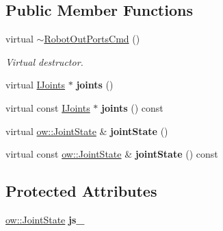 \subsection*{Public Member Functions}
\begin{DoxyCompactItemize}
\item 
virtual \hyperlink{classow__core_1_1RobotOutPortsCmd_ad018ac0a0a8c73aaf7bc62f7b28a0268}{$\sim$\+Robot\+Out\+Ports\+Cmd} ()\hypertarget{classow__core_1_1RobotOutPortsCmd_ad018ac0a0a8c73aaf7bc62f7b28a0268}{}\label{classow__core_1_1RobotOutPortsCmd_ad018ac0a0a8c73aaf7bc62f7b28a0268}

\begin{DoxyCompactList}\small\item\em Virtual destructor. \end{DoxyCompactList}\item 
virtual \hyperlink{classow__core_1_1IJoints}{I\+Joints} $\ast$ {\bfseries joints} ()\hypertarget{classow__core_1_1RobotOutPortsCmd_afb61fc492e221bfa994cf13c2ed92df6}{}\label{classow__core_1_1RobotOutPortsCmd_afb61fc492e221bfa994cf13c2ed92df6}

\item 
virtual const \hyperlink{classow__core_1_1IJoints}{I\+Joints} $\ast$ {\bfseries joints} () const \hypertarget{classow__core_1_1RobotOutPortsCmd_ad28a8aa922b9edf3815e016bbade0678}{}\label{classow__core_1_1RobotOutPortsCmd_ad28a8aa922b9edf3815e016bbade0678}

\item 
virtual \hyperlink{classow__core_1_1JointState}{ow\+::\+Joint\+State} \& {\bfseries joint\+State} ()\hypertarget{classow__core_1_1RobotOutPortsCmd_a4ea1c3b05b424d5c286d41ef73abca6f}{}\label{classow__core_1_1RobotOutPortsCmd_a4ea1c3b05b424d5c286d41ef73abca6f}

\item 
virtual const \hyperlink{classow__core_1_1JointState}{ow\+::\+Joint\+State} \& {\bfseries joint\+State} () const \hypertarget{classow__core_1_1RobotOutPortsCmd_a29242a677dca4a3c0a1f0ea74d088fc6}{}\label{classow__core_1_1RobotOutPortsCmd_a29242a677dca4a3c0a1f0ea74d088fc6}

\end{DoxyCompactItemize}
\subsection*{Protected Attributes}
\begin{DoxyCompactItemize}
\item 
\hyperlink{classow__core_1_1JointState}{ow\+::\+Joint\+State} {\bfseries js\+\_\+}\hypertarget{classow__core_1_1RobotOutPortsCmd_aece9d52a653226289b960d1a421fadc7}{}\label{classow__core_1_1RobotOutPortsCmd_aece9d52a653226289b960d1a421fadc7}

\end{DoxyCompactItemize}


